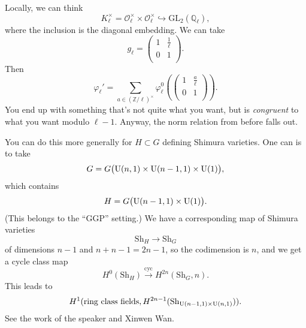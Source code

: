 \documentclass[reqno]{amsart} 
\begin{document}
Locally, we can think
\begin{equation*}
  K_{\ell}^\times = \mathcal{O}_{\ell}^\times \times \mathcal{O}_{\ell}^\times \hookrightarrow \mathrm{GL}_2(\mathbb{Q}_{\ell}),
\end{equation*}
where the inclusion is the diagonal embedding.  We can take
\begin{equation*}
  g_{\ell} =
  \begin{pmatrix}
    1 & \frac{1}{\ell} \\
    0 & 1 \\
  \end{pmatrix}.
\end{equation*}
Then
\begin{equation*}
  \varphi_{\ell} '
  = \sum
  _{a \in(\mathbb{Z} / \ell)^\times}
  \varphi_{\ell}^0 \left(
    \begin{pmatrix}
    1      & \frac{a}{\ell} \\
    0             & 1 \\
    \end{pmatrix} \right).
\end{equation*}
You end up with something that's not quite what you want, but is \emph{congruent} to what you want modulo $\ell - 1$.  Anyway, the norm relation from before falls out.

You can do this more generally for $H \subset G$ defining Shimura varieties.  One can is to take
\begin{equation*}
  G = G\bigl(\operatorname{U}(n, 1) \times \operatorname{U}(n - 1, 1) \times \operatorname{U}(1)\bigr),
\end{equation*}
which contains
\begin{equation*}
  H = G \bigl( \operatorname{U}(n - 1, 1) \times \operatorname{U}(1) \bigr).
\end{equation*}
(This belongs to the ``GGP'' setting.)  We have a corresponding map of Shimura varieties
\begin{equation*}
  \mathrm{Sh}_H \rightarrow \mathrm{Sh}_G
\end{equation*}
of dimensions $n - 1$ and $n + n - 1 = 2 n - 1$, so the codimension is $n$, and we get a cycle class map
\begin{equation*}
  H^0(\mathrm{Sh}_H) \xrightarrow{\mathrm{cyc}} H^{2 n}(\mathrm{Sh}_G, n).
\end{equation*}
This leads to
\begin{equation*}
  H^1(\text{ring class fields}, H^{2 n - 1}(\mathrm{Sh}_{\operatorname{U}(n - 1, 1) \times \operatorname{U}(n, 1)})).
\end{equation*}
See the work of the speaker and Xinwen Wan.
\end{document}
